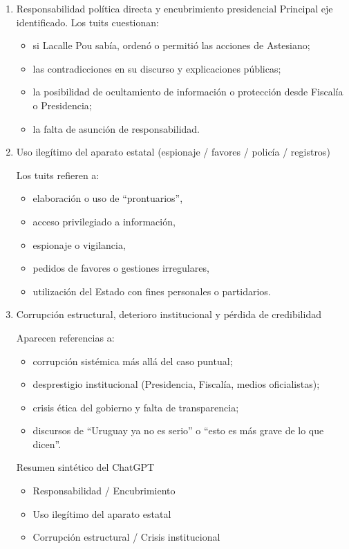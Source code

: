 \documentclass[spanish]{textolivre}
\begin{document}
\begin{enumerate}
    \item Responsabilidad política directa y encubrimiento presidencial
 Principal eje identificado. Los tuits cuestionan:

 \begin{itemize}
     \item  si Lacalle Pou sabía, ordenó o permitió las acciones de Astesiano;
    \item las contradicciones en su discurso y explicaciones públicas;
    \item la posibilidad de ocultamiento de información o protección desde Fiscalía o Presidencia;
    \item la falta de asunción de responsabilidad.
 \end{itemize}

\item Uso ilegítimo del aparato estatal (espionaje / favores / policía / registros)

 Los tuits refieren a:

\begin{itemize}
    \item elaboración o uso de “prontuarios”,
    \item acceso privilegiado a información,
    \item espionaje o vigilancia,
    \item pedidos de favores o gestiones irregulares,
    \item utilización del Estado con fines personales o partidarios.
\end{itemize}

\item Corrupción estructural, deterioro institucional y pérdida de credibilidad

Aparecen referencias a:

\begin{itemize}
    \item corrupción sistémica más allá del caso puntual;
    \item desprestigio institucional (Presidencia, Fiscalía, medios oficialistas);
    \item crisis ética del gobierno y falta de transparencia;
    \item discursos de “Uruguay ya no es serio” o “esto es más grave de lo que dicen”.
\end{itemize}

Resumen sintético del ChatGPT

\begin{itemize}
    \item Responsabilidad / Encubrimiento
    \item Uso ilegítimo del aparato estatal
    \item Corrupción estructural / Crisis institucional
\end{itemize}

\end{enumerate}
 
\end{document}

